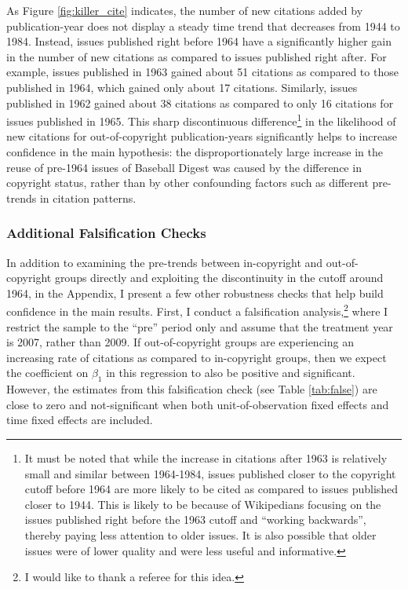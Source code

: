 \documentclass[11pt]{article}
\begin{document}
As Figure \ref{fig:killer_cite} indicates, the number of new citations added by publication-year does not display a steady time trend that decreases from 1944 to 1984. Instead, issues published right before 1964 have a significantly higher gain in the number of new citations as compared to issues published right after. For example, issues published in 1963 gained about 51 citations as compared to those published in 1964, which gained only about 17 citations. Similarly, issues published in 1962 gained about 38 citations as compared to only 16 citations for issues published in 1965. This sharp discontinuous difference\footnote{It must be noted that while the increase in citations after 1963 is relatively small and similar between 1964-1984, issues published closer to the copyright cutoff before 1964 are more likely to be cited as compared to issues published closer to 1944. This is likely to be because of Wikipedians focusing on the issues published right before the 1963 cutoff and ``working backwards'', thereby paying less attention to older issues. It is also possible that older issues were of lower quality and were less useful and informative.} in the likelihood of new citations for out-of-copyright publication-years significantly helps to increase confidence in the main hypothesis: the disproportionately large increase in the reuse of pre-1964 issues of Baseball Digest was caused by the difference in copyright status, rather than by other confounding factors such as different pre-trends in citation patterns.

\subsubsection{Additional Falsification Checks}

In addition to examining the pre-trends between in-copyright and out-of-copyright groups directly and exploiting the discontinuity in the cutoff around 1964, in the Appendix, I present a few other robustness checks that help build confidence in the main results. First, I conduct a falsification analysis,\footnote{I would like to thank a referee for this idea.} where I restrict the sample to the ``pre'' period only and assume that the treatment year is 2007, rather than 2009. If out-of-copyright groups are experiencing an increasing rate of citations as compared to in-copyright groups, then we expect the coefficient on $\beta_1$ in this regression to also be positive and significant. However, the estimates from this falsification check (see Table \ref{tab:false}) are close to zero and not-significant when both unit-of-observation fixed effects and time fixed effects are included.
\end{document}
